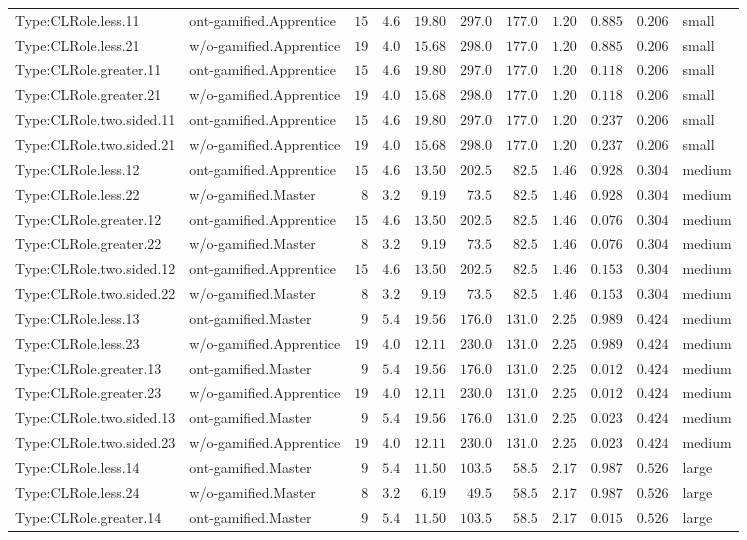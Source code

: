 \documentclass[6pt,a4paper]{article}
\begin{document}
{\begin{longtable}{llrrrrrrrrl}
Type:CLRole.less.11&ont-gamified.Apprentice&$15$&$4.6$&$19.80$&$297.0$&$177.0$&$ 1.20$&$0.885$&$0.206$&small\tabularnewline
Type:CLRole.less.21&w/o-gamified.Apprentice&$19$&$4.0$&$15.68$&$298.0$&$177.0$&$ 1.20$&$0.885$&$0.206$&small\tabularnewline
Type:CLRole.greater.11&ont-gamified.Apprentice&$15$&$4.6$&$19.80$&$297.0$&$177.0$&$ 1.20$&$0.118$&$0.206$&small\tabularnewline
Type:CLRole.greater.21&w/o-gamified.Apprentice&$19$&$4.0$&$15.68$&$298.0$&$177.0$&$ 1.20$&$0.118$&$0.206$&small\tabularnewline
Type:CLRole.two.sided.11&ont-gamified.Apprentice&$15$&$4.6$&$19.80$&$297.0$&$177.0$&$ 1.20$&$0.237$&$0.206$&small\tabularnewline
Type:CLRole.two.sided.21&w/o-gamified.Apprentice&$19$&$4.0$&$15.68$&$298.0$&$177.0$&$ 1.20$&$0.237$&$0.206$&small\tabularnewline
Type:CLRole.less.12&ont-gamified.Apprentice&$15$&$4.6$&$13.50$&$202.5$&$ 82.5$&$ 1.46$&$0.928$&$0.304$&medium\tabularnewline
Type:CLRole.less.22&w/o-gamified.Master&$ 8$&$3.2$&$ 9.19$&$ 73.5$&$ 82.5$&$ 1.46$&$0.928$&$0.304$&medium\tabularnewline
Type:CLRole.greater.12&ont-gamified.Apprentice&$15$&$4.6$&$13.50$&$202.5$&$ 82.5$&$ 1.46$&$0.076$&$0.304$&medium\tabularnewline
Type:CLRole.greater.22&w/o-gamified.Master&$ 8$&$3.2$&$ 9.19$&$ 73.5$&$ 82.5$&$ 1.46$&$0.076$&$0.304$&medium\tabularnewline
Type:CLRole.two.sided.12&ont-gamified.Apprentice&$15$&$4.6$&$13.50$&$202.5$&$ 82.5$&$ 1.46$&$0.153$&$0.304$&medium\tabularnewline
Type:CLRole.two.sided.22&w/o-gamified.Master&$ 8$&$3.2$&$ 9.19$&$ 73.5$&$ 82.5$&$ 1.46$&$0.153$&$0.304$&medium\tabularnewline
Type:CLRole.less.13&ont-gamified.Master&$ 9$&$5.4$&$19.56$&$176.0$&$131.0$&$ 2.25$&$0.989$&$0.424$&medium\tabularnewline
Type:CLRole.less.23&w/o-gamified.Apprentice&$19$&$4.0$&$12.11$&$230.0$&$131.0$&$ 2.25$&$0.989$&$0.424$&medium\tabularnewline
Type:CLRole.greater.13&ont-gamified.Master&$ 9$&$5.4$&$19.56$&$176.0$&$131.0$&$ 2.25$&$0.012$&$0.424$&medium\tabularnewline
Type:CLRole.greater.23&w/o-gamified.Apprentice&$19$&$4.0$&$12.11$&$230.0$&$131.0$&$ 2.25$&$0.012$&$0.424$&medium\tabularnewline
Type:CLRole.two.sided.13&ont-gamified.Master&$ 9$&$5.4$&$19.56$&$176.0$&$131.0$&$ 2.25$&$0.023$&$0.424$&medium\tabularnewline
Type:CLRole.two.sided.23&w/o-gamified.Apprentice&$19$&$4.0$&$12.11$&$230.0$&$131.0$&$ 2.25$&$0.023$&$0.424$&medium\tabularnewline
Type:CLRole.less.14&ont-gamified.Master&$ 9$&$5.4$&$11.50$&$103.5$&$ 58.5$&$ 2.17$&$0.987$&$0.526$&large\tabularnewline
Type:CLRole.less.24&w/o-gamified.Master&$ 8$&$3.2$&$ 6.19$&$ 49.5$&$ 58.5$&$ 2.17$&$0.987$&$0.526$&large\tabularnewline
Type:CLRole.greater.14&ont-gamified.Master&$ 9$&$5.4$&$11.50$&$103.5$&$ 58.5$&$ 2.17$&$0.015$&$0.526$&large\tabularnewline

\end{longtable}}
\end{document}
